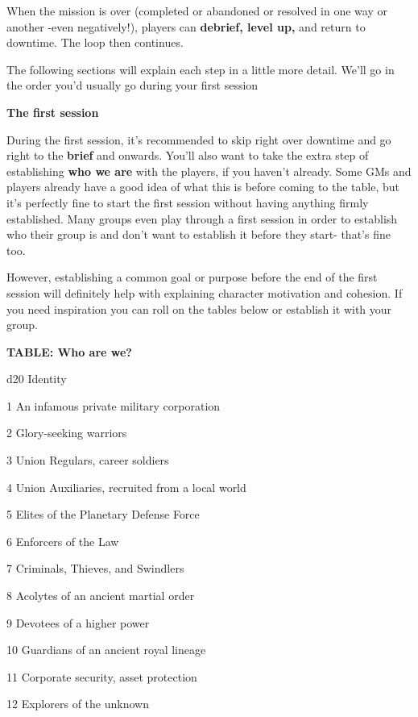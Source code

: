 When the mission is over (completed or abandoned or resolved in one way or another -even negatively!), players can \textbf{debrief, level up,} and return to downtime. The loop then continues.

The following sections will explain each step in a little more detail. We’ll go in the order you’d usually go during your first session

\begin{center}
\textbf{The first session}
\end{center}

During the first session, it’s recommended to skip right over downtime and go right to the \textbf{brief} and onwards. You’ll also want to take the extra step of establishing \textbf{who we are} with the players, if you haven’t already. Some GMs and players already have a good idea of what this is before coming to the table, but it’s perfectly fine to start the first session without having anything firmly established. Many groups even play through a first session in order to establish who their group is and don’t want to establish it before they start- that’s fine too.

However, establishing a common goal or purpose before the end of the first session will definitely help with explaining character motivation and cohesion. If you need inspiration you can roll on the tables below or establish it with your group.

\textbf{TABLE: Who are we?}

 d20       Identity

 1         An infamous private military corporation

 2         Glory-seeking warriors

 3         Union Regulars, career soldiers

 4         Union Auxiliaries, recruited from a local world

 5         Elites of the Planetary Defense Force

 6         Enforcers of the Law

 7         Criminals, Thieves, and Swindlers

 8         Acolytes of an ancient martial order

 9         Devotees of a higher power

  10       Guardians of an ancient royal lineage

  11       Corporate security, asset protection

  12       Explorers of the unknown

